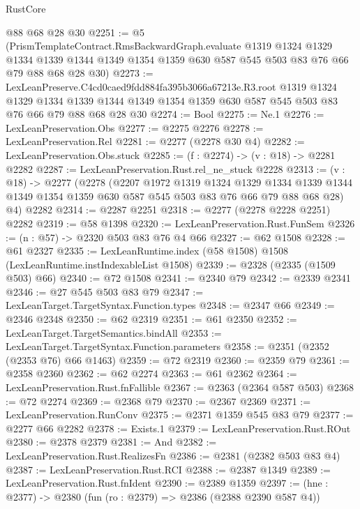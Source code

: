 \begin{lexlean}{RustCore}
\begin{coremodule}
    @88
    @68
    @28
    @30
@2251 := @5
    (PrismTemplateContract.RmsBackwardGraph.evaluate
      @1319
      @1324
      @1329
      @1334
      @1339
      @1344
      @1349
      @1354
      @1359
      @630
      @587
      @545
      @503
      @83
      @76
      @66
      @79
      @88
      @68
      @28
      @30)
@2273 := LexLeanPreserve.C4cd0caed9fdd884fa395b3066a67213e.R3.root
    @1319
    @1324
    @1329
    @1334
    @1339
    @1344
    @1349
    @1354
    @1359
    @630
    @587
    @545
    @503
    @83
    @76
    @66
    @79
    @88
    @68
    @28
    @30
@2274 := Bool
@2275 := Ne.{1}
@2276 := LexLeanPreservation.Obs
@2277 := @2275 @2276
@2278 := LexLeanPreservation.Rel
@2281 := @2277 (@2278 @30 @4)
@2282 := LexLeanPreservation.Obs.stuck
@2285 := (f : @2274) -> (v : @18) -> @2281 @2282
@2287 := LexLeanPreservation.Rust.rel_ne_stuck @2228
@2313 := (v : @18) ->
  @2277
    (@2278
      (@2207
        @1972
        @1319
        @1324
        @1329
        @1334
        @1339
        @1344
        @1349
        @1354
        @1359
        @630
        @587
        @545
        @503
        @83
        @76
        @66
        @79
        @88
        @68
        @28)
      @4)
    @2282
@2314 := @2287 @2251
@2318 := @2277 (@2278 @2228 @2251) @2282
@2319 := @58 @1398
@2320 := LexLeanPreservation.Rust.FunSem
@2326 := (n : @57) -> @2320 @503 @83 @76 @4 @66
@2327 := @62 @1508
@2328 := @61 @2327
@2335 := LexLeanRuntime.index (@58 @1508) @1508 (LexLeanRuntime.instIndexableList @1508)
@2339 := @2328 (@2335 (@1509 @503) @66)
@2340 := @72 @1508
@2341 := @2340 @79
@2342 := @2339 @2341
@2346 := @27 @545 @503 @83 @79
@2347 := LexLeanTarget.TargetSyntax.Function.types
@2348 := @2347 @66
@2349 := @2346 @2348
@2350 := @62 @2319
@2351 := @61 @2350
@2352 := LexLeanTarget.TargetSemantics.bindAll
@2353 := LexLeanTarget.TargetSyntax.Function.parameters
@2358 := @2351 (@2352 (@2353 @76) @66 @1463)
@2359 := @72 @2319
@2360 := @2359 @79
@2361 := @2358 @2360
@2362 := @62 @2274
@2363 := @61 @2362
@2364 := LexLeanPreservation.Rust.fnFallible
@2367 := @2363 (@2364 @587 @503)
@2368 := @72 @2274
@2369 := @2368 @79
@2370 := @2367 @2369
@2371 := LexLeanPreservation.RunConv
@2375 := @2371 @1359 @545 @83 @79
@2377 := @2277 @66 @2282
@2378 := Exists.{1}
@2379 := LexLeanPreservation.Rust.ROut
@2380 := @2378 @2379
@2381 := And
@2382 := LexLeanPreservation.Rust.RealizesFn
@2386 := @2381 (@2382 @503 @83 @4)
@2387 := LexLeanPreservation.Rust.RCI
@2388 := @2387 @1349
@2389 := LexLeanPreservation.Rust.fnIdent
@2390 := @2389 @1359
@2397 := (hne : @2377) -> @2380 (fun (ro : @2379) => @2386 (@2388 @2390 @587 @4))

\end{coremodule}
\end{lexlean}
